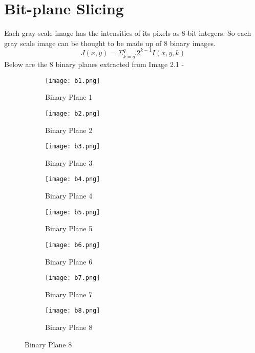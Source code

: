 \documentclass{report}
\begin{document}
\section{Bit-plane Slicing}
Each gray-scale image has the intensities of its pixels as 8-bit integers. So each gray scale image can be thought to be made up of 8 binary images.
\[J(x,y) = \Sigma_{k=q^{'}}^{q}2^{k-1}I(x,y,k)\]
Below are the 8 binary planes extracted from Image 2.1 - 
\begin{figure}[h]
    \begin{subfigure}{0.25\textwidth}
        \centering
    \texttt{[image: b1.png]}
    \caption{Binary Plane 1}
    \end{subfigure}
    \begin{subfigure}{0.25\textwidth}
        \centering
    \texttt{[image: b2.png]}
    \caption{Binary Plane 2}
    \end{subfigure}
    \begin{subfigure}{0.25\textwidth}
        \centering
    \texttt{[image: b3.png]}
    \caption{Binary Plane 3}
    \end{subfigure}
    \begin{subfigure}{0.25\textwidth}
        \centering
    \texttt{[image: b4.png]}
    \caption{Binary Plane 4}
    \end{subfigure}
    \begin{subfigure}{0.25\textwidth}
        \centering
    \texttt{[image: b5.png]}
    \caption{Binary Plane 5}
    \end{subfigure}
    \begin{subfigure}{0.25\textwidth}
        \centering
    \texttt{[image: b6.png]}
    \caption{Binary Plane 6}
    \end{subfigure}
    \begin{subfigure}{0.25\textwidth}
        \centering
    \texttt{[image: b7.png]}
    \caption{Binary Plane 7}
    \end{subfigure}
    \begin{subfigure}{0.25\textwidth}
        \centering
    \texttt{[image: b8.png]}
    \caption{Binary Plane 8}
    \end{subfigure}
\end{figure}
\end{document}
